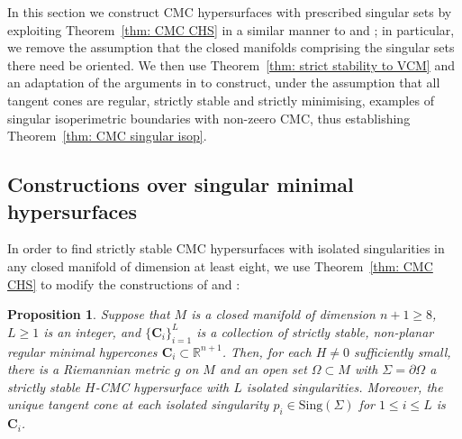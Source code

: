 \documentclass[12pt]{article}
\newtheorem{proposition}{Proposition}
\begin{document}
In this section we construct CMC hypersurfaces with prescribed singular sets by exploiting Theorem~\ref{thm: CMC CHS} in a similar manner to \cite[Theorem 3]{MN26} and \cite[Theorems 1 \& 2]{S00}; in particular, we remove the assumption that the closed manifolds comprising the singular sets there need be oriented. We then use Theorem~\ref{thm: strict stability to VCM} and an adaptation of the arguments in \cite[Corollary 2]{MN26} to construct, under the assumption that all tangent cones are regular, strictly stable and strictly minimising, examples of singular isoperimetric boundaries with non-zeero CMC, thus establishing Theorem~\ref{thm: CMC singular isop}.

\subsection{Constructions over singular minimal hypersurfaces}\label{subsec: constructions}

In order to find strictly stable CMC hypersurfaces with isolated singularities in any closed manifold of dimension at least eight, we use Theorem~\ref{thm: CMC CHS} to modify the constructions of \cite[Theorem 3]{MN26} and \cite[Theorem 1]{S00}:

\begin{proposition}\label{prop: construction in prescribed ambient}
    Suppose that $M$ is a closed manifold of dimension $n + 1 \geq 8$, $L \geq 1$ is an integer, and $\{\mathbf{C}_i\}_{i = 1}^L$ is a collection of strictly stable, non-planar regular minimal hypercones $\mathbf{C}_i \subset \mathbb{R}^{n+1}$. Then, for each $H \neq 0$ sufficiently small, there is a Riemannian metric $g$ on $M$ and an open set $\Omega \subset M$ with $\Sigma = \partial \Omega$ a strictly stable $H$-CMC hypersurface with $L$ isolated singularities. Moreover, the unique tangent cone at each isolated singularity $p_i \in \mathrm{Sing}(\Sigma)$  for $1 \leq i \leq L$ is $\mathbf{C}_i$.
\end{proposition}
\end{document}
